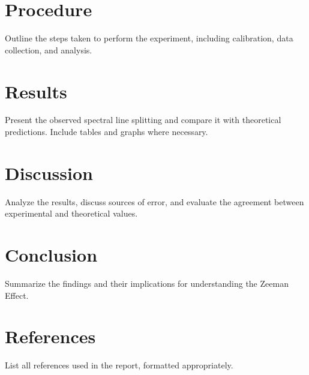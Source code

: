 \documentclass[a4paper,12pt]{article}
\begin{document}
\section{Procedure}
Outline the steps taken to perform the experiment, including calibration, data collection, and analysis.

\section{Results}
Present the observed spectral line splitting and compare it with theoretical predictions. Include tables and graphs where necessary.

\section{Discussion}
Analyze the results, discuss sources of error, and evaluate the agreement between experimental and theoretical values.

\section{Conclusion}
Summarize the findings and their implications for understanding the Zeeman Effect.

\section*{References}
List all references used in the report, formatted appropriately.
\end{document}
